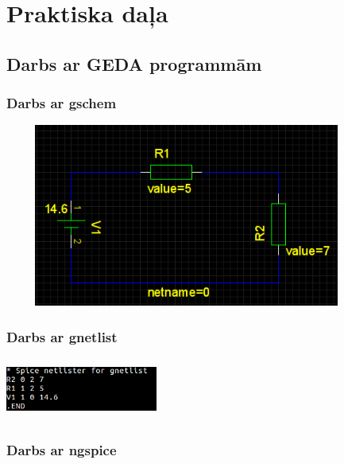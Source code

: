 \documentclass{report}
\begin{document}
\chapter{Praktiska daļa}
\section{Darbs ar GEDA programmām}
    \subsection{Darbs ar gschem}

        \includegraphics[width=12cm, height=6cm]{2.png}

    \subsection{Darbs ar gnetlist}

\includegraphics[width=5cm, height=2cm]{3.png}

\subsection{Darbs ar ngspice}
   
\end{document}
